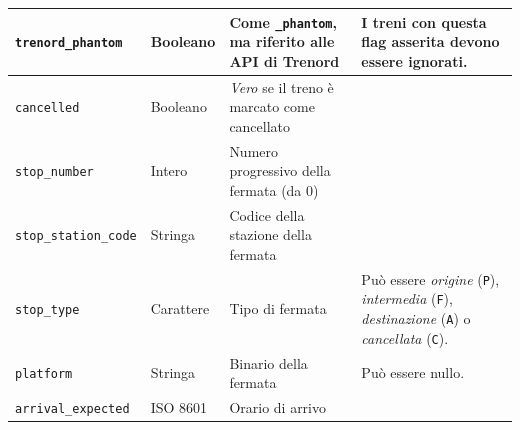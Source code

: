 \documentclass[12pt,italian]{report}
\begin{document}
\begin{table}[p]
\begin{tabular}{m{3.5cm} || m{1.7cm} | m{5.3cm} | m{3.5cm}}
      \hline \texttt{trenord\_phantom} & Booleano & Come
                                                    \texttt{\_phantom},
                                                    ma riferito alle API
                                                    di Trenord
                                                            & I treni
                                                              con
                                                              questa
                                                              flag
                                                              asserita
                                                              devono
                                                              essere
                                                              ignorati. \\
      \hline \texttt{cancelled} & Booleano & \textit{Vero} se il treno 
                                             è marcato come cancellato \\
      \hline \texttt{stop\_number} & Intero & Numero progressivo della
                                              fermata (da 0) & \\
      \hline \texttt{stop\_station\_code} & Stringa & Codice della
                                                      stazione della
                                                      fermata & \\
      \hline \texttt{stop\_type} & Carattere & Tipo di fermata
                                                            & Può essere
                                                              \textit{origine}
                                                              (\texttt{P}),
                                                              \textit{intermedia}
                                                              (\texttt{F}),
                                                              \textit{destinazione}
                                                              (\texttt{A}) o
                                                              \textit{cancellata}
                                                              (\texttt{C}).
      \\
      \hline \texttt{platform} & Stringa & Binario della fermata & Può
                                                                   essere
                                                                   nullo. \\
      \hline \texttt{arrival\_expected} & ISO 8601 & Orario di arrivo

\end{tabular}
\end{table}
\end{document}
